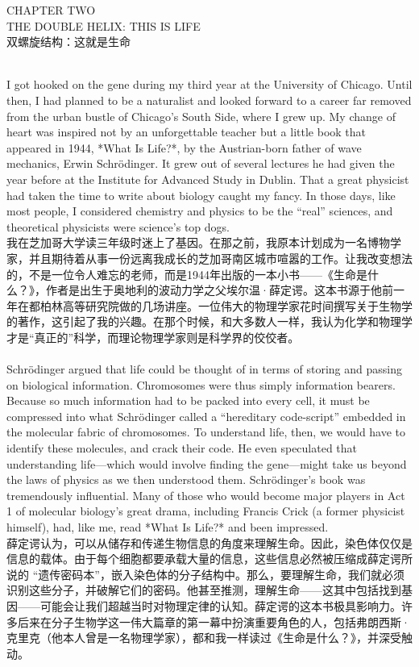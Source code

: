 \documentclass{article}
\begin{document}
\begin{center}
CHAPTER TWO\\
THE DOUBLE HELIX: THIS IS LIFE\\
双螺旋结构：这就是生命 
\end{center}

\\
I got hooked on the gene during my third year at the University of Chicago. Until then, I had planned to be a naturalist and looked forward to a career far removed from the urban bustle of Chicago’s South Side, where I grew up. My change of heart was inspired not by an unforgettable teacher but a little book that appeared in 1944, *What Is Life?*, by the Austrian-born father of wave mechanics, Erwin Schrödinger. It grew out of several lectures he had given the year before at the Institute for Advanced Study in Dublin. That a great physicist had taken the time to write about biology caught my fancy. In those days, like most people, I considered chemistry and physics to be the “real” sciences, and theoretical physicists were science’s top dogs.\\
我在芝加哥大学读三年级时迷上了基因。在那之前，我原本计划成为一名博物学家，并且期待着从事一份远离我成长的芝加哥南区城市喧嚣的工作。让我改变想法的，不是一位令人难忘的老师，而是1944年出版的一本小书——《生命是什么？》，作者是出生于奥地利的波动力学之父埃尔温·薛定谔。这本书源于他前一年在都柏林高等研究院做的几场讲座。一位伟大的物理学家花时间撰写关于生物学的著作，这引起了我的兴趣。在那个时候，和大多数人一样，我认为化学和物理学才是“真正的”科学，而理论物理学家则是科学界的佼佼者。\\

\\
Schrödinger argued that life could be thought of in terms of storing and passing on biological information. Chromosomes were thus simply information bearers. Because so much information had to be packed into every cell, it must be compressed into what Schrödinger called a “hereditary code-script” embedded in the molecular fabric of chromosomes. To understand life, then, we would have to identify these molecules, and crack their code. He even speculated that understanding life—which would involve finding the gene—might take us beyond the laws of physics as we then understood them. Schrödinger’s book was tremendously influential. Many of those who would become major players in Act 1 of molecular biology’s great drama, including Francis Crick (a former physicist himself), had, like me, read *What Is Life?* and been impressed.\\
薛定谔认为，可以从储存和传递生物信息的角度来理解生命。因此，染色体仅仅是信息的载体。由于每个细胞都要承载大量的信息，这些信息必然被压缩成薛定谔所说的 “遗传密码本”，嵌入染色体的分子结构中。那么，要理解生命，我们就必须识别这些分子，并破解它们的密码。他甚至推测，理解生命——这其中包括找到基因——可能会让我们超越当时对物理定律的认知。薛定谔的这本书极具影响力。许多后来在分子生物学这一伟大篇章的第一幕中扮演重要角色的人，包括弗朗西斯·克里克（他本人曾是一名物理学家），都和我一样读过《生命是什么？》，并深受触动。 \\
\end{document}
